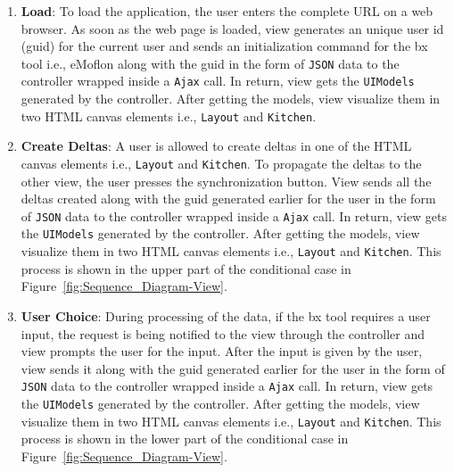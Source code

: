 \begin{enumerate}
	\item {\textbf{Load}: To load the application, the user enters the complete URL on a web browser. As soon as the web page is loaded, view generates an unique user id (guid) for the current user and sends an initialization command for the bx tool i.e., eMoflon along with the guid in the form of \texttt{JSON} data to the controller wrapped inside a \texttt{Ajax} call. In return, view gets the \texttt{UIModels} generated by the controller. After getting the models, view visualize them in two HTML canvas elements i.e., \texttt{Layout} and \texttt{Kitchen}.}
	
	\item {\textbf{Create Deltas}: A user is allowed to create deltas in one of the HTML canvas elements i.e., \texttt{Layout} and \texttt{Kitchen}. To propagate the deltas to the other view, the user presses the synchronization button. View sends all the deltas created along with the guid generated earlier for the user in the form of \texttt{JSON} data to the controller wrapped inside a \texttt{Ajax} call. In return, view gets the \texttt{UIModels} generated by the controller. After getting the models, view visualize them in two HTML canvas elements i.e., \texttt{Layout} and \texttt{Kitchen}. This process is shown in the upper part of the conditional case in Figure~\ref{fig:Sequence_Diagram-View}.}
	
	\item {\textbf{User Choice}: During processing of the data, if the bx tool requires a user input, the request is being notified to the view through the controller and view prompts the user for the input. After the input is given by the user, view sends it along with the guid generated earlier for the user in the form of \texttt{JSON} data to the controller wrapped inside a \texttt{Ajax} call. In return, view gets the \texttt{UIModels} generated by the controller. After getting the models, view visualize them in two HTML canvas elements i.e., \texttt{Layout} and \texttt{Kitchen}. This process is shown in the lower part of the conditional case in Figure~\ref{fig:Sequence_Diagram-View}.}
\end{enumerate}

